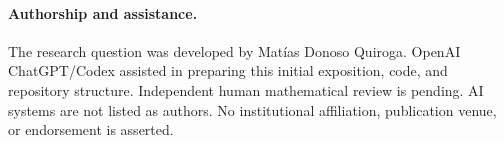\paragraph{Authorship and assistance.}
The research question was developed by Matías Donoso Quiroga.
OpenAI ChatGPT/Codex assisted in preparing this initial exposition,
code, and repository structure. Independent human mathematical
review is pending. AI systems are not listed as authors.
No institutional affiliation, publication venue, or endorsement
is asserted.
